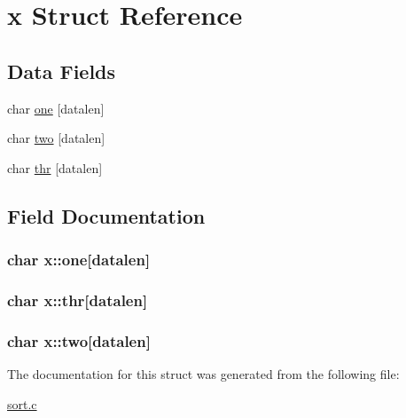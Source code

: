 \hypertarget{structx}{
\section{x Struct Reference}
\label{structx}
}
\subsection*{Data Fields}
\begin{DoxyCompactItemize}
\item 
char \hyperlink{structx_ada9242fc0b7c8398dfe7f4ac06f242b5}{one} \mbox{[}datalen\mbox{]}
\item 
char \hyperlink{structx_aa6170fc8ccb03b106c7f2019d9370409}{two} \mbox{[}datalen\mbox{]}
\item 
char \hyperlink{structx_a9d2fd6ef8ca16dc617c587c521e6f067}{thr} \mbox{[}datalen\mbox{]}
\end{DoxyCompactItemize}


\subsection{Field Documentation}
\hypertarget{structx_ada9242fc0b7c8398dfe7f4ac06f242b5}{
\subsubsection[{one}]{\setlength{\rightskip}{0pt plus 5cm}char {\bf x::one}\mbox{[}datalen\mbox{]}}}
\label{structx_ada9242fc0b7c8398dfe7f4ac06f242b5}
\hypertarget{structx_a9d2fd6ef8ca16dc617c587c521e6f067}{
\subsubsection[{thr}]{\setlength{\rightskip}{0pt plus 5cm}char {\bf x::thr}\mbox{[}datalen\mbox{]}}}
\label{structx_a9d2fd6ef8ca16dc617c587c521e6f067}
\hypertarget{structx_aa6170fc8ccb03b106c7f2019d9370409}{
\subsubsection[{two}]{\setlength{\rightskip}{0pt plus 5cm}char {\bf x::two}\mbox{[}datalen\mbox{]}}}
\label{structx_aa6170fc8ccb03b106c7f2019d9370409}


The documentation for this struct was generated from the following file:\begin{DoxyCompactItemize}
\item 
\hyperlink{sort_8c}{sort.c}\end{DoxyCompactItemize}
